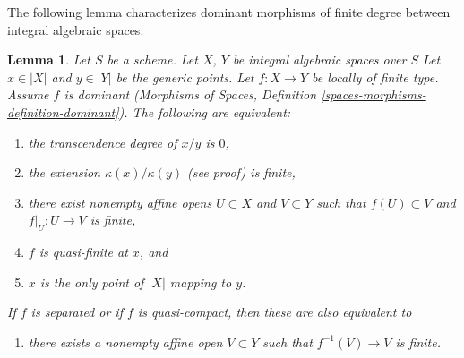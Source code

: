 \documentclass{stacks-project}
\theoremstyle{plain}
\newtheorem{lemma}[subsection]{Lemma}
\theoremstyle{definition}
\theoremstyle{remark}
\numberwithin{equation}{subsection}
\begin{document}
\noindent
The following lemma characterizes dominant morphisms of finite degree
between integral algebraic spaces.

\begin{lemma}
\label{lemma-finite-degree}
Let $S$ be a scheme. Let $X$, $Y$ be integral algebraic spaces over $S$
Let $x \in |X|$ and $y \in |Y|$ be the generic points. Let $f : X \to Y$
be locally of finite type. Assume $f$ is dominant
(Morphisms of Spaces, Definition \ref{spaces-morphisms-definition-dominant}).
The following are equivalent:
\begin{enumerate}
\item the transcendence degree of $x/y$ is $0$,
\item the extension $\kappa(x)/\kappa(y)$ (see proof) is finite,
\item there exist nonempty affine opens $U \subset X$ and $V \subset Y$
such that $f(U) \subset V$ and $f|_U : U \to V$ is finite,
\item $f$ is quasi-finite at $x$, and
\item $x$ is the only point of $|X|$ mapping to $y$.
\end{enumerate}
If $f$ is separated or if $f$ is quasi-compact, then these are
also equivalent to
\begin{enumerate}
\item[(6)] there exists a nonempty affine open $V \subset Y$ such
that $f^{-1}(V) \to V$ is finite.
\end{enumerate}
\end{lemma}
\end{document}
